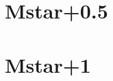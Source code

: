 \documentclass[twocolumn]{article}
\begin{document}
\section{Mstar+0.5}


\section{Mstar+1}




\end{document}
